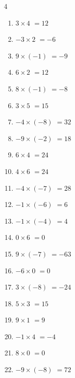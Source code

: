 \begin{multicols}{4}
\begin{enumerate}
  \item $3\times 4$
        $=12$

  \item $-3\times 2$
        $=-6$

  \item $9\times (-1)$
        $=-9$

  \item $6\times 2$
        $=12$

  \item $8\times (-1)$
        $=-8$

  \item $3\times 5$
        $=15$

  \item $-4\times (-8)$
        $=32$

  \item $-9\times (-2)$
        $=18$

  \item $6\times 4$
        $=24$

  \item $4\times 6$
        $=24$

  \item $-4\times (-7)$
        $=28$

  \item $-1\times (-6)$
        $=6$

  \item $-1\times (-4)$
        $=4$

  \item $0\times 6$
        $=0$

  \item $9\times (-7)$
        $=-63$

  \item $-6\times 0$
        $=0$

  \item $3\times (-8)$
        $=-24$

  \item $5\times 3$
        $=15$

  \item $9\times 1$
        $=9$

  \item $-1\times 4$
        $=-4$

  \item $8\times 0$
        $=0$

  \item $-9\times (-8)$
        $=72$

\columnbreak %


\end{enumerate}
\end{multicols}
